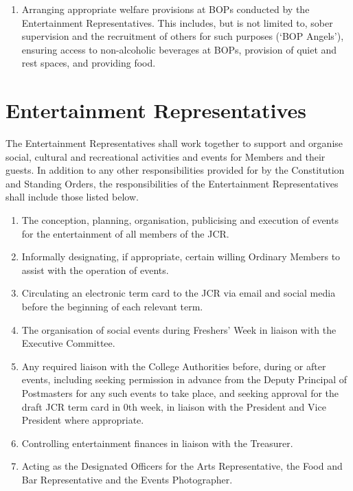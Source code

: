 \begin{enumerate}
	\item Arranging appropriate welfare provisions at BOPs conducted by the Entertainment Representatives. This includes, but is not limited to, sober supervision and the recruitment of others for such purposes (`BOP Angels'), ensuring access to non-alcoholic beverages at BOPs, provision of quiet and rest spaces, and providing food.
\end{enumerate}
\section{Entertainment Representatives}
\npara The Entertainment Representatives shall work together to support and organise social, cultural and recreational activities and events for Members  and their guests.
\npara In addition to any other responsibilities provided for by the Constitution and Standing Orders, the responsibilities of the Entertainment Representatives shall include those listed below.
\begin{enumerate}
	\item The conception, planning, organisation, publicising and execution of events for the entertainment of all members of the JCR.
	\item Informally designating, if appropriate, certain willing Ordinary Members to assist with the operation of events.
	\item Circulating an electronic term card to the JCR via email and social media before the beginning of each relevant term.
	\item The organisation of social events during Freshers' Week in liaison with the Executive Committee.
	\item Any required liaison with the College Authorities before, during or after events, including seeking permission in advance from the Deputy Principal of Postmasters for any such events to take place, and seeking approval for the draft JCR term card in 0th week, in liaison with the President and Vice President where appropriate.
	\item Controlling entertainment finances in liaison with the Treasurer.
	\item Acting as the Designated Officers for the Arts Representative, the Food and Bar Representative and the Events Photographer.
\end{enumerate}
